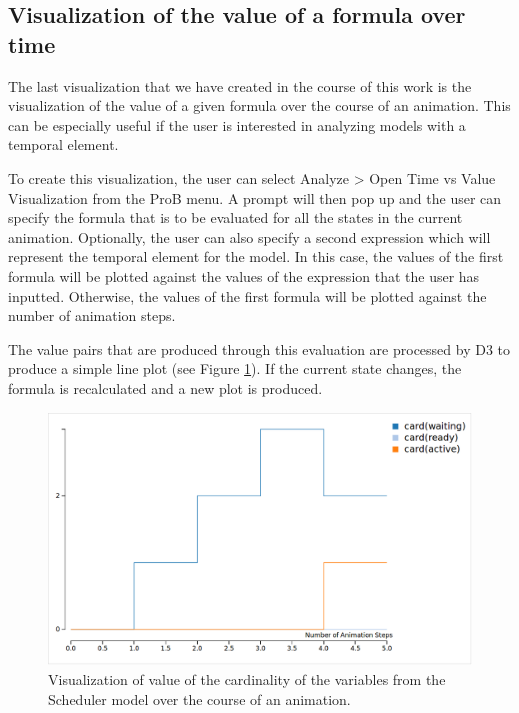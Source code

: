 \subsection{Visualization of the value of a formula over time}

The last visualization that we have created in the course of this work is the visualization of the value of a given formula over the course of an animation.
This can be especially useful if the user is interested in analyzing models with a temporal element. 

To create this visualization, the user can select \textsf{Analyze > Open Time vs Value Visualization} from the \textsf{ProB} menu. A prompt will then pop up and the user can specify the formula that is to be evaluated for all the states in the current animation. Optionally, the user can also specify a second expression which will represent the temporal element for the model. In this case, the values of the first formula will be plotted against the values of the expression that the user has inputted. Otherwise, the values of the first formula will be plotted against the number of animation steps.

The value pairs that are produced through this evaluation are processed by D3 to produce a simple line plot (see Figure \ref{timeVsValue}). If the current state changes, the formula is recalculated and a new plot is produced.

\begin{center}
\begin{figure}[h!]
\centering
\includegraphics[width=14cm]{bilder/valueOverTime.png}
\caption{Visualization of value of the cardinality of the variables from the Scheduler model over the course of an animation.}
\label{timeVsValue}
\end{figure}
\end{center}

